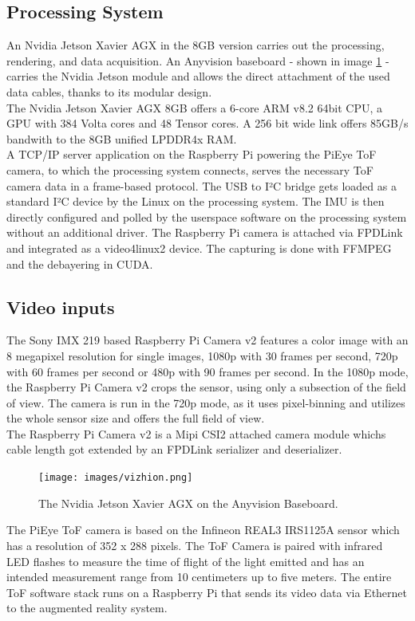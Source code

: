 \subsection{Processing System}
\label{sec:procSystem}
An Nvidia Jetson Xavier AGX in the 8GB version carries out the processing, rendering, and data acquisition. An Anyvision baseboard - shown in image \ref{fig:anyvision} - carries the Nvidia Jetson module and allows the direct attachment of the used data cables, thanks to its modular design.\cite{groo:Thesis:2020}\\
The Nvidia Jetson Xavier AGX 8GB offers a 6-core ARM v8.2 64bit CPU, a GPU with 384 Volta cores and 48 Tensor cores. A 256 bit wide link offers 85GB/s bandwith to the 8GB unified LPDDR4x RAM.\\
A TCP/IP server application on the Raspberry Pi powering the PiEye ToF camera, to which the processing system connects, serves the necessary ToF camera data in a frame-based protocol. The USB to I²C bridge gets loaded as a standard I²C device by the Linux on the processing system. The IMU is then directly configured and polled by the userspace software on the processing system without an additional driver. The Raspberry Pi camera is attached via FPDLink and integrated as a video4linux2 device. The capturing is done with FFMPEG and the debayering in CUDA.\cite{iszt:BA:2021}
\subsection{Video inputs}
\label{sec:videoInputs}
The Sony IMX 219 based Raspberry Pi Camera v2 features a color image with an 8 megapixel resolution for single images, 1080p with 30 frames per second, 720p with 60 frames per second or 480p with 90 frames per second.\cite{raspiCamSpec} In the 1080p mode, the Raspberry Pi Camera v2 crops the sensor, using only a subsection of the field of view. The camera is run in the 720p mode, as it uses pixel-binning and utilizes the whole sensor size and offers the full field of view.\\
The Raspberry Pi Camera v2 is a Mipi CSI2 attached camera module whichs cable length got extended by an FPDLink serializer and deserializer.
\begin{figure}[H]
    \centering
    \texttt{[image: images/vizhion.png]}
    \caption{The Nvidia Jetson Xavier AGX on the Anyvision Baseboard.}
    \label{fig:anyvision}
\end{figure}
The PiEye ToF camera is based on the Infineon REAL3 IRS1125A sensor which has a resolution of 352 x 288 pixels\cite{piEyeShop}. The ToF Camera is paired with infrared LED flashes to measure the time of flight of the light emitted and has an intended measurement range from 10 centimeters up to five meters. The entire ToF software stack runs on a Raspberry Pi that sends its video data via Ethernet to the augmented reality system.
